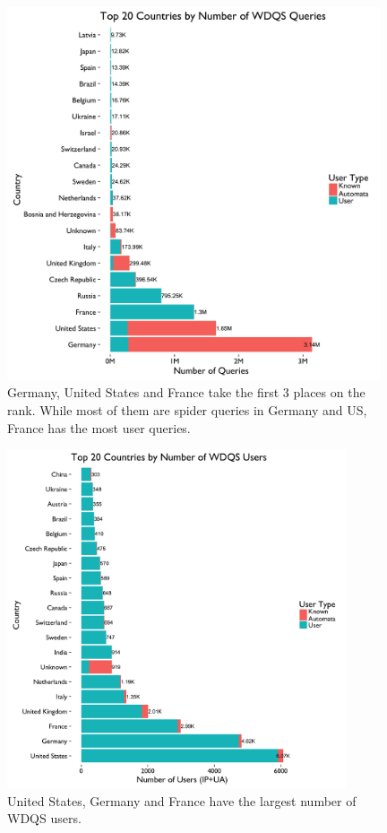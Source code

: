 \documentclass[12pt,]{article}
\begin{document}
\begin{figure}[H]
\centering
\includegraphics[width=11cm,height=11cm,keepaspectratio]{figures/n_query_by_country.png}
\caption{Germany, United States and France take the first 3 places on
the rank. While most of them are spider queries in Germany and US,
France has the most user queries.}
\end{figure}

\begin{figure}[H]
\centering
\includegraphics[width=10cm,height=10cm,keepaspectratio]{figures/n_user_by_country.png}
\caption{United States, Germany and France have the largest number of
WDQS users.}
\end{figure}
\end{document}
